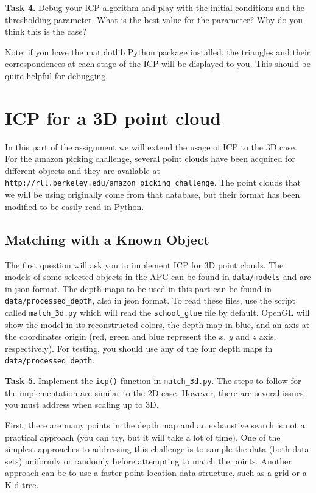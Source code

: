 \documentclass[a4paper,11pt]{article}
\begin{document}
{\bf Task 4.}  Debug your ICP algorithm and play with the initial conditions and
the thresholding parameter.  What is the best value for the parameter?
Why do you think this is the case?

Note: if you have the matplotlib Python package installed, the triangles and their
correspondences at each stage of the ICP will be displayed to you.  This should
be quite helpful for debugging.


\section{ICP for a 3D point cloud}

In this part of the assignment we will extend the usage of ICP to the 3D case. 
For the amazon picking challenge, several point clouds have been acquired for
different objects and they are available at
\texttt{http://rll.berkeley.edu/amazon\_picking\_challenge}. The point clouds
that we will be using originally come from that database, but their format has
been modified to be easily read in Python.

\subsection{Matching with a Known Object}

The first question will ask you to implement ICP for 3D point clouds.
The models of some selected objects in the APC can be
found in \texttt{data/models} and are in json format. The depth maps to be used
in this part can be found in \texttt{data/processed\_depth}, also in json
format. To read these files, use the script called
\texttt{match\_3d.py} which will read the \texttt{school\_glue} file by
default. OpenGL will show the model in its reconstructed colors, the depth map in blue, and an axis
at the coordinates origin (red, green and blue represent the $x$, $y$ and $z$
axis, respectively).  For testing, you should use any of the four depth maps in \texttt{data/processed\_depth}.

{\bf Task 5.}  Implement the \texttt{icp()} function in \texttt{match\_3d.py}.
The steps to follow for the implementation are similar to the 2D
case. However, there are several issues you must address when scaling up to 3D.

First, there are many points in the depth map and an exhaustive search
is not a practical approach (you can try, but it will take a lot of time). One
of the simplest approaches to addressing this challenge is to sample the data (both
data sets) uniformly or randomly before attempting to match the points. Another
approach can be to use a faster point location data structure, such as a grid or
a K-d tree.
\end{document}
